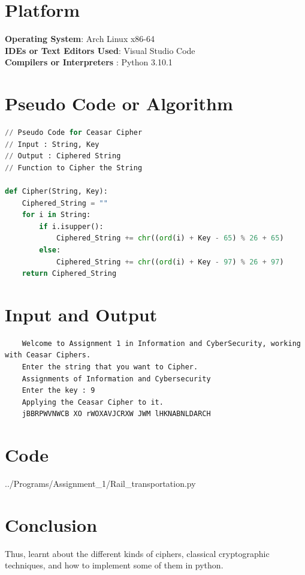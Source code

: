 \documentclass[openany]{book}
\begin{document}
\begin{enumerate}
\end{enumerate}

\section{Platform}
\textbf{Operating System}: Arch Linux x86-64 \\
\textbf{IDEs or Text Editors Used}: Visual Studio Code\\
\textbf{Compilers or Interpreters} : Python 3.10.1\\

\section{Pseudo Code or Algorithm}
\begin{lstlisting}[language=Python]
// Pseudo Code for Ceasar Cipher
// Input : String, Key
// Output : Ciphered String
// Function to Cipher the String

def Cipher(String, Key):
	Ciphered_String = ""
	for i in String:
		if i.isupper():
			Ciphered_String += chr((ord(i) + Key - 65) % 26 + 65)
		else:
			Ciphered_String += chr((ord(i) + Key - 97) % 26 + 97)
	return Ciphered_String

\end{lstlisting}
\section{Input and Output}
\begin{verbatim}
	Welcome to Assignment 1 in Information and CyberSecurity, working with Ceasar Ciphers. 
	Enter the string that you want to Cipher. 
	Assignments of Information and Cybersecurity
	Enter the key : 9
	Applying the Ceasar Cipher to it. 
	jBBRPWVNWCB XO rWOXAVJCRXW JWM lHKNABNLDARCH
\end{verbatim}
\section{Code}



{../Programs/Assignment_1/Rail_transportation.py}
\section{Conclusion}
Thus, learnt about the different kinds of ciphers, classical cryptographic techniques, and how to implement some of them in python.
\clearpage
\end{document}
